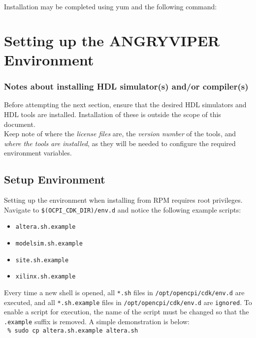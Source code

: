 Installation may be completed using yum and the following command:\\


\section{Setting up the ANGRYVIPER Environment}
\label{sec:setup_av}
\subsubsection*{Notes about installing HDL simulator(s) and/or compiler(s)}
Before attempting the next section, ensure that the desired HDL simulators and HDL tools are installed. Installation of these is outside the scope of this document.\\

Keep note of where the \textit{license files} are, the \textit{version number} of the tools, and \textit{where the tools are installed}, as they will be needed to configure the required environment variables.

\subsection{Setup Environment} \label{setenv}
\label{subsec:setup_environment}

Setting up the environment when installing from RPM requires root privileges. Navigate to \verb+$(OCPI_CDK_DIR)/env.d+ and notice the following example scripts:

\begin{itemize}
 	\item \verb+altera.sh.example+
 	\item \verb+modelsim.sh.example+
 	\item \verb+site.sh.example+
 	\item \verb+xilinx.sh.example+
\end{itemize}

Every time a new shell is opened, all \verb+*.sh+ files in \verb+/opt/opencpi/cdk/env.d+ are executed, and all \verb+*.sh.example+ files in \verb+/opt/opencpi/cdk/env.d+ are \texttt{ignored}. To enable a script for execution, the name of the script must be changed so that the \verb+.example+ suffix is removed. A simple demonstration is below:\\

\verb+ % sudo cp altera.sh.example altera.sh+\\

